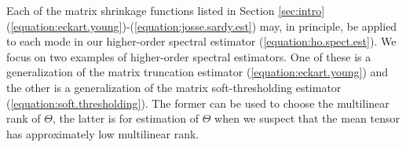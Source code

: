 Each of the matrix shrinkage functions listed in Section \ref{sec:intro} (\ref{equation:eckart.young})-(\ref{equation:josse.sardy.est}) may, in principle, be applied to each mode in our higher-order spectral estimator (\ref{equation:ho.spect.est}). We focus on two examples of higher-order spectral estimators. One of these is a generalization of the matrix truncation estimator (\ref{equation:eckart.young}) and the other is a generalization of the  matrix soft-thresholding estimator (\ref{equation:soft.thresholding}). The former can be used to choose the multilinear rank of $\Theta$, the latter is for estimation of $\Theta$ when we suspect that the mean tensor has approximately low multilinear rank.

